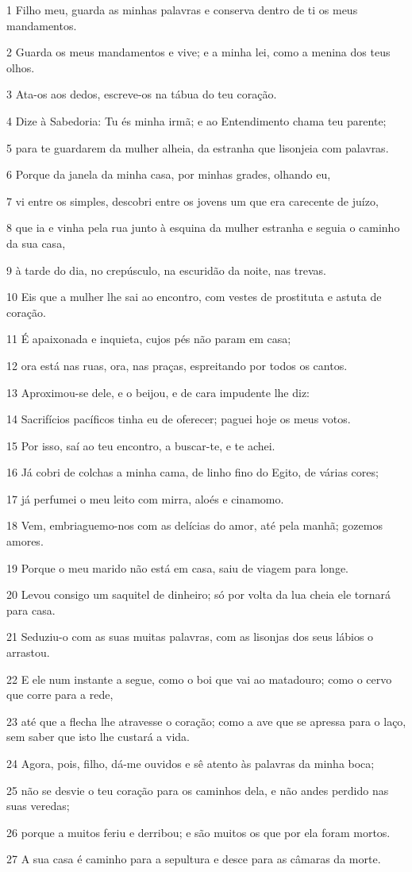 \par 1 Filho meu, guarda as minhas palavras e conserva dentro de ti os meus mandamentos.
\par 2 Guarda os meus mandamentos e vive; e a minha lei, como a menina dos teus olhos.
\par 3 Ata-os aos dedos, escreve-os na tábua do teu coração.
\par 4 Dize à Sabedoria: Tu és minha irmã; e ao Entendimento chama teu parente;
\par 5 para te guardarem da mulher alheia, da estranha que lisonjeia com palavras.
\par 6 Porque da janela da minha casa, por minhas grades, olhando eu,
\par 7 vi entre os simples, descobri entre os jovens um que era carecente de juízo,
\par 8 que ia e vinha pela rua junto à esquina da mulher estranha e seguia o caminho da sua casa,
\par 9 à tarde do dia, no crepúsculo, na escuridão da noite, nas trevas.
\par 10 Eis que a mulher lhe sai ao encontro, com vestes de prostituta e astuta de coração.
\par 11 É apaixonada e inquieta, cujos pés não param em casa;
\par 12 ora está nas ruas, ora, nas praças, espreitando por todos os cantos.
\par 13 Aproximou-se dele, e o beijou, e de cara impudente lhe diz:
\par 14 Sacrifícios pacíficos tinha eu de oferecer; paguei hoje os meus votos.
\par 15 Por isso, saí ao teu encontro, a buscar-te, e te achei.
\par 16 Já cobri de colchas a minha cama, de linho fino do Egito, de várias cores;
\par 17 já perfumei o meu leito com mirra, aloés e cinamomo.
\par 18 Vem, embriaguemo-nos com as delícias do amor, até pela manhã; gozemos amores.
\par 19 Porque o meu marido não está em casa, saiu de viagem para longe.
\par 20 Levou consigo um saquitel de dinheiro; só por volta da lua cheia ele tornará para casa.
\par 21 Seduziu-o com as suas muitas palavras, com as lisonjas dos seus lábios o arrastou.
\par 22 E ele num instante a segue, como o boi que vai ao matadouro; como o cervo que corre para a rede,
\par 23 até que a flecha lhe atravesse o coração; como a ave que se apressa para o laço, sem saber que isto lhe custará a vida.
\par 24 Agora, pois, filho, dá-me ouvidos e sê atento às palavras da minha boca;
\par 25 não se desvie o teu coração para os caminhos dela, e não andes perdido nas suas veredas;
\par 26 porque a muitos feriu e derribou; e são muitos os que por ela foram mortos.
\par 27 A sua casa é caminho para a sepultura e desce para as câmaras da morte.

